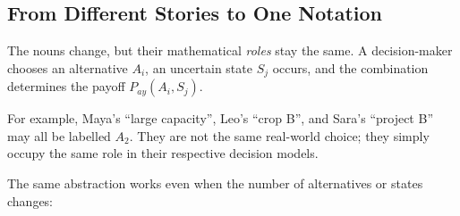 	\subsection{From Different Stories to One Notation}
	\label{sec:one-notation}
	
	The nouns change, but their mathematical \emph{roles} stay the same. A
	decision-maker chooses an alternative \(A_i\), an uncertain state \(S_j\)
	occurs, and the combination determines the payoff \(P_{ay}(A_i,S_j)\).
	
	For example, Maya's ``large capacity'', Leo's ``crop B'', and Sara's
	``project B'' may all be labelled \(A_2\). They are not the same real-world
	choice; they simply occupy the same role in their respective decision models.
	
	The same abstraction works even when the number of alternatives or states
	changes:
	
